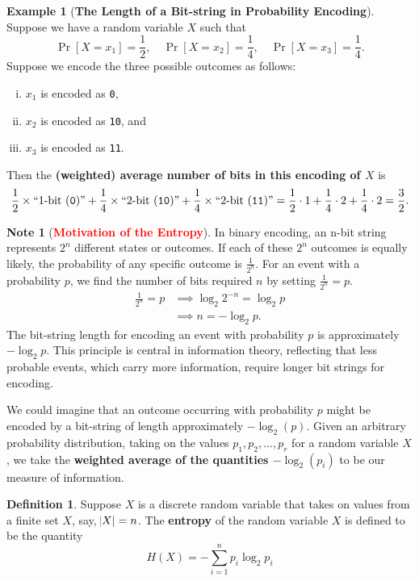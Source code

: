 \documentclass[12pt,openany]{book}
\theoremstyle{definition}
\newtheorem{definition}{Definition}[chapter]
\newtheorem{example}{Example}[chapter]
\newtheorem*{note}{Note}
\begin{document}
\vspace{24pt}
\begin{example}[\bf The Length of a Bit-string in Probability Encoding]
	Suppose we have a random variable \(X\) such that
	\[
	\Pr[X=x_1]=\frac{1}{2},\quad\Pr[X=x_2]=\frac{1}{4},\quad\Pr[X=x_3]=\frac{1}{4}.
	\] Suppose we encode the three possible outcomes as follows: \begin{enumerate}[(i)]
		\item \(x_1\) is encoded as \texttt{0},
		\item \(x_2\) is encoded as \texttt{10}, and
		\item \(x_3\) is encoded as \texttt{11}.
	\end{enumerate} Then the \textbf{(weighted) average number of bits in this encoding of \(X\)} is \[
	\frac{1}{2}\times\text{``1-bit (\texttt{0})''}+\frac{1}{4}\times\text{``2-bit (\texttt{10})''}+\frac{1}{4}\times\text{``2-bit (\texttt{11})''}=\frac{1}{2}\cdot 1 +\frac{1}{4}\cdot 2 + \frac{1}{4}\cdot2 = \frac{3}{2}.
	\] 
\end{example}
\vspace{24pt}
\begin{note}[\textcolor{red}{\bf Motivation of the Entropy}]
	In binary encoding, an n-bit string represents $2^n$ different states or outcomes.
	If each of these $2^n$ outcomes is equally likely, the probability of any specific outcome is $\frac{1}{2^n}$.
	For an event with a probability $p$, we find the number of bits required $n$ by setting $\frac{1}{2^n} = p$.
	\begin{align*}
		\frac{1}{2^n}=p&\implies \log_2 2^{-n} = \log_2 p\\
		&\implies n = -\log_2p.
	\end{align*}
	The bit-string length for encoding an event with probability $p$ is approximately $-\log_2p$.
	This principle is central in information theory, reflecting that less probable events, which carry more information, require longer bit strings for encoding.\par
	We could imagine that an outcome occurring with probability \(p\) might be encoded by a bit-string of length approximately \(-\log_2(p)\). Given an arbitrary probability distribution, taking on the values \(p_1, p_2, \ldots, p_r\) for a random variable \(X\), we take the \textbf{weighted average of the quantities \(-\log_2(p_i)\)} to be our measure of information.
\end{note}
\begin{tcolorbox}[colback=white,colframe=defcolor,arc=5pt,title={\color{white}\bf Entropy of Finite Random Variable}]
	\begin{definition}
		Suppose \(X\) is a discrete random variable that takes on values from a finite set \(X\), say, $\abs{X}=n$. The \textbf{entropy} of the random variable \(X\) is defined to be the quantity
		\[ H(X) = -\sum_{i=1}^{n} p_i \log_2p_i \]
	\end{definition}
\end{tcolorbox}
\end{document}

